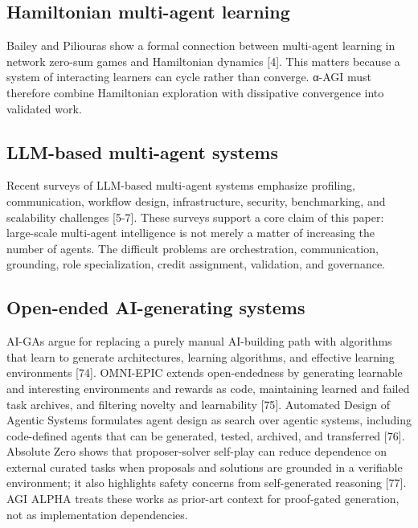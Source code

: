 \subsection{Hamiltonian multi-agent
learning}\label{hamiltonian-multi-agent-learning}

Bailey and Piliouras show a formal connection between multi-agent
learning in network zero-sum games and Hamiltonian dynamics {[}4{]}.
This matters because a system of interacting learners can cycle rather
than converge. α-AGI must therefore combine Hamiltonian exploration with
dissipative convergence into validated work.

\subsection{LLM-based multi-agent
systems}\label{llm-based-multi-agent-systems}

Recent surveys of LLM-based multi-agent systems emphasize profiling,
communication, workflow design, infrastructure, security, benchmarking,
and scalability challenges {[}5-7{]}. These surveys support a core claim
of this paper: large-scale multi-agent intelligence is not merely a
matter of increasing the number of agents. The difficult problems are
orchestration, communication, grounding, role specialization, credit
assignment, validation, and governance.

\subsection{Open-ended AI-generating
systems}\label{open-ended-ai-generating-systems}

AI-GAs argue for replacing a purely manual AI-building path with
algorithms that learn to generate architectures, learning algorithms,
and effective learning environments {[}74{]}. OMNI-EPIC extends
open-endedness by generating learnable and interesting environments and
rewards as code, maintaining learned and failed task archives, and
filtering novelty and learnability {[}75{]}. Automated Design of Agentic
Systems formulates agent design as search over agentic systems,
including code-defined agents that can be generated, tested, archived,
and transferred {[}76{]}. Absolute Zero shows that proposer-solver
self-play can reduce dependence on external curated tasks when proposals
and solutions are grounded in a verifiable environment; it also
highlights safety concerns from self-generated reasoning {[}77{]}. AGI
ALPHA treats these works as prior-art context for proof-gated
generation, not as implementation dependencies.


